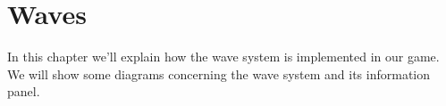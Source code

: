 \section{Waves}
\label{sec:waves}

In this chapter we'll explain how the wave system is implemented in our game. 
We will show some diagrams concerning the wave system and its information 
panel.


\newpage

